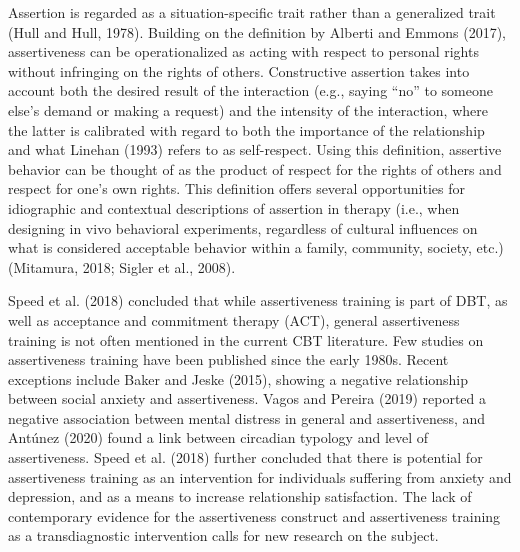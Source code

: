 \documentclass[3p]{elsarticle} %
\begin{document}
Assertion is regarded as a situation-specific trait rather than a
generalized trait (Hull and Hull, 1978). Building on the definition by
Alberti and Emmons (2017), assertiveness can be operationalized as
acting with respect to personal rights without infringing on the rights
of others. Constructive assertion takes into account both the desired
result of the interaction (e.g., saying ``no'' to someone else's demand
or making a request) and the intensity of the interaction, where the
latter is calibrated with regard to both the importance of the
relationship and what Linehan (1993) refers to as self-respect. Using
this definition, assertive behavior can be thought of as the product of
respect for the rights of others and respect for one's own rights. This
definition offers several opportunities for idiographic and contextual
descriptions of assertion in therapy (i.e., when designing in vivo
behavioral experiments, regardless of cultural influences on what is
considered acceptable behavior within a family, community, society,
etc.) (Mitamura, 2018; Sigler et al., 2008).

Speed et al. (2018) concluded that while assertiveness training is part
of DBT, as well as acceptance and commitment therapy (ACT), general
assertiveness training is not often mentioned in the current CBT
literature. Few studies on assertiveness training have been published
since the early 1980s. Recent exceptions include Baker and Jeske (2015),
showing a negative relationship between social anxiety and
assertiveness. Vagos and Pereira (2019) reported a negative association
between mental distress in general and assertiveness, and Antúnez (2020)
found a link between circadian typology and level of assertiveness.
Speed et al. (2018) further concluded that there is potential for
assertiveness training as an intervention for individuals suffering from
anxiety and depression, and as a means to increase relationship
satisfaction. The lack of contemporary evidence for the assertiveness
construct and assertiveness training as a transdiagnostic intervention
calls for new research on the subject.
\end{document}
